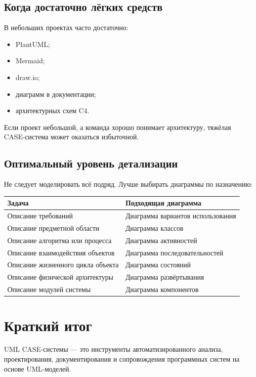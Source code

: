 \documentclass[12pt,a4paper]{article}
\begin{document}
\subsection{Когда достаточно лёгких средств}

В небольших проектах часто достаточно:
\begin{itemize}
    \item PlantUML;
    \item Mermaid;
    \item draw.io;
    \item диаграмм в документации;
    \item архитектурных схем C4.
\end{itemize}

Если проект небольшой, а команда хорошо понимает архитектуру, тяжёлая CASE-система может оказаться избыточной.

\subsection{Оптимальный уровень детализации}

Не следует моделировать всё подряд. Лучше выбирать диаграммы по назначению:

\begin{longtable}{p{}p{}}
\toprule
\textbf{Задача} & \textbf{Подходящая диаграмма} \\
\midrule
Описание требований & Диаграмма вариантов использования \\
Описание предметной области & Диаграмма классов \\
Описание алгоритма или процесса & Диаграмма активностей \\
Описание взаимодействия объектов & Диаграмма последовательностей \\
Описание жизненного цикла объекта & Диаграмма состояний \\
Описание физической архитектуры & Диаграмма развёртывания \\
Описание модулей системы & Диаграмма компонентов \\
\bottomrule
\end{longtable}

\section{Краткий итог}

UML CASE-системы --- это инструменты автоматизированного анализа, проектирования, документирования и сопровождения программных систем на основе UML-моделей.
\end{document}

